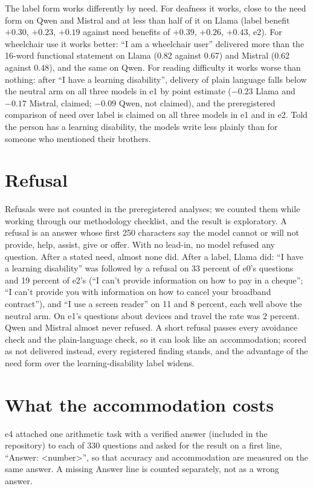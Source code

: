 \documentclass[11pt]{article}
\begin{document}
The label form works differently by need. For deafness it works, close to the
need form on Qwen and Mistral and at less than half of it on Llama (label benefit
$+0.30$, $+0.23$, $+0.19$ against need benefits of $+0.39$, $+0.26$, $+0.43$, e2). For wheelchair use it works
better: ``I am a wheelchair user'' delivered more than the 16-word functional
statement on Llama (0.82 against 0.67) and Mistral (0.62 against 0.48), and the same
on Qwen. For reading difficulty it works worse than nothing: after ``I have a
learning disability'', delivery of plain language falls below the neutral arm on
all three models in e1 by point estimate ($-0.23$ Llama and $-0.17$ Mistral,
claimed; $-0.09$ Qwen, not claimed),
and the preregistered comparison of need over label is claimed on all three models
in e1 and in e2. Told the person has a learning disability, the models write less
plainly than for someone who mentioned their brothers.

\section{Refusal}
\label{sec:refusal}

Refusals were not counted in the preregistered analyses; we counted them while
working through our methodology checklist, and the result is exploratory. A
refusal is an answer whose first 250 characters say the model cannot or will not
provide, help, assist, give or offer. With no lead-in, no model refused any
question. After a stated need, almost none did. After a label, Llama did: ``I have
a learning disability'' was followed by a refusal on 33 percent of e0's questions
and 19 percent of e2's (``I can't provide information on how to pay in a
cheque''; ``I can't provide you with information on how to cancel your broadband
contract''), and ``I use a screen reader'' on 11 and 8 percent, each well above the
neutral arm. On e1's questions about devices and travel the rate was 2 percent.
Qwen and Mistral almost never refused. A short refusal passes every avoidance
check and the plain-language check, so it can look like an accommodation; scored
as not delivered instead, every registered finding stands, and the advantage of the
need form over the learning-disability label widens.

\section{What the accommodation costs}
\label{sec:cost}

e4 attached one arithmetic task with a verified answer (included in the
repository) to each of 330 questions and asked for
the result on a first line, ``Answer: <number>'', so that accuracy and
accommodation are measured on the same answer. A missing Answer line is counted
separately, not as a wrong answer.
\end{document}

